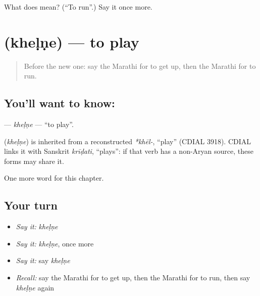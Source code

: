 \begin{tcolorbox}[breakable,colback=teal!4,colframe=teal!35!black,title={Before you move on}]
What does  mean? (\textquotedblleft{}To run\textquotedblright{}.) Say it once more.
\end{tcolorbox}
\section[\texorpdfstring{\mr{खेळणे} (kheḷṇe)}{खेळणे (kheḷṇe)}]{ (kheḷṇe) — to play}

\label{lesson:MR-C78-khelne}



\begin{quote}
Before the new one: say the Marathi for to get up, then the Marathi for to run.
\end{quote}

\subsection*{You'll want to know: }
\textbf{} — \emph{kheḷṇe} — \textquotedblleft{}to play\textquotedblright{}.

\begin{cousinweb}
\textbf{} (\emph{kheḷṇe}) is inherited from a reconstructed \emph{*khēl-}, \textquotedblleft{}play\textquotedblright{} (CDIAL 3918). CDIAL links it with Sanskrit \emph{krīḍati}, \textquotedblleft{}plays\textquotedblright{}: if that verb has a non-Aryan source, these forms may share it.
\end{cousinweb}

\begin{grammarlens}[title={What you've built}]
One more word for this chapter.
\end{grammarlens}

\subsection*{Your turn}
\begin{itemize}
\raggedright
  \item \emph{Say it:} \emph{kheḷṇe}
  \item \emph{Say it:} \emph{kheḷṇe}, once more
  \item \emph{Say it:} say \emph{kheḷṇe}
  \item \emph{Recall:} say the Marathi for to get up, then the Marathi for to run, then say \emph{kheḷṇe} again
\end{itemize}

